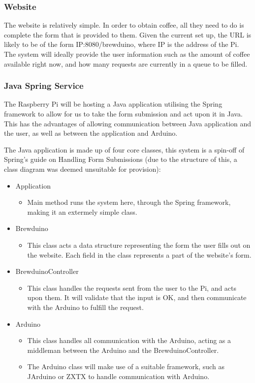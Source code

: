\documentclass[12pt, a4paper]{article}
\begin{document}
\subsubsection{Website}
The website is relatively simple. In order to obtain coffee, all they need to
do is complete the form that is provided to them. Given the current set up, the
URL is likely to be of the form IP:8080/brewduino, where IP is the address of
the Pi. The system will ideally provide the user information such as the amount
of coffee available right now, and how many requests are currently in a queue to
be filled.

\subsubsection{Java Spring Service}
The Raspberry Pi will be hosting a Java application utilising the Spring
framework to allow for us to take the form submission and act upon it in Java.
This has the advantages of allowing communication between Java application and
the user, as well as between the application and Arduino.

The Java application is made up of four core classes, this system is a spin-off
of Spring's guide on Handling Form Submissions\cite{SpringGuide} (due to the
structure of this, a class diagram was deemed unsuitable for provision):
\begin{itemize}
	\item Application
	\begin{itemize}
		\item Main method runs the system here, through the Spring framework,
		making it an extermely simple class.
	\end{itemize}
	\item Brewduino
	\begin{itemize}
		\item This class acts a data structure representing the form the user
		fills out on the website. Each field in the class represents a part of
		the website's form.
	\end{itemize}
	\item BrewduinoController
	\begin{itemize}
		\item This class handles the requests sent from the user to the Pi, and
		acts upon them. It will validate that the input is OK, and then
		communicate with the Arduino to fulfill the request.
	\end{itemize}
	\item Arduino
	\begin{itemize}
		\item This class handles all communication with the Arduino, acting as a
		middleman between the Arduino and the BrewduinoController.
		\item The Arduino class will make use of a suitable framework, such as
		JArduino\cite{JArduino} or ZXTX\cite{RXTX} to handle communication with
		Arduino.
	\end{itemize}
\end{itemize}
\newpage
\end{document}
